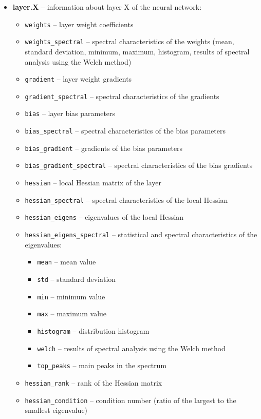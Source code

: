 \documentclass[a4paper,12pt]{article}
\begin{document}
\begin{itemize}
  \item \textbf{layer.X} -- information about layer X of the neural network:
    \begin{itemize}
      \item \texttt{weights} -- layer weight coefficients
      \item \texttt{weights\_spectral} -- spectral characteristics of the weights (mean, standard deviation, minimum, maximum, histogram, results of spectral analysis using the Welch method)
      \item \texttt{gradient} -- layer weight gradients
      \item \texttt{gradient\_spectral} -- spectral characteristics of the gradients
      \item \texttt{bias} -- layer bias parameters
      \item \texttt{bias\_spectral} -- spectral characteristics of the bias parameters
      \item \texttt{bias\_gradient} -- gradients of the bias parameters
      \item \texttt{bias\_gradient\_spectral} -- spectral characteristics of the bias gradients
      \item \texttt{hessian} -- local Hessian matrix of the layer
      \item \texttt{hessian\_spectral} -- spectral characteristics of the local Hessian
      \item \texttt{hessian\_eigens} -- eigenvalues of the local Hessian
      \item \texttt{hessian\_eigens\_spectral} -- statistical and spectral characteristics of the eigenvalues:
        \begin{itemize}
          \item \texttt{mean} -- mean value
          \item \texttt{std} -- standard deviation
          \item \texttt{min} -- minimum value
          \item \texttt{max} -- maximum value
          \item \texttt{histogram} -- distribution histogram
          \item \texttt{welch} -- results of spectral analysis using the Welch method
          \item \texttt{top\_peaks} -- main peaks in the spectrum
        \end{itemize}
      \item \texttt{hessian\_rank} -- rank of the Hessian matrix
      \item \texttt{hessian\_condition} -- condition number (ratio of the largest to the smallest eigenvalue)
    \end{itemize}


\end{itemize}
\end{document}
